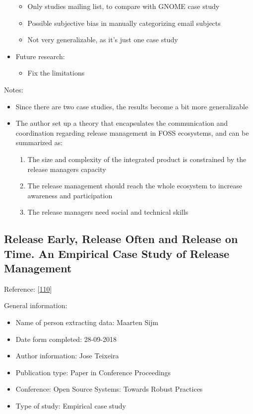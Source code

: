 \documentclass[]{book}
\providecommand{\tightlist}{%
  \setlength{\itemsep}{0pt}\setlength{\parskip}{0pt}}
\begin{document}
\begin{itemize}
  \begin{itemize}
  \tightlist
  \item
    Only studies mailing list, to compare with GNOME case study
  \item
    Possible subjective bias in manually categorizing email subjects
  \item
    Not very generalizable, as it's just one case study
  \end{itemize}
\item
  Future research:

  \begin{itemize}
  \tightlist
  \item
    Fix the limitations
  \end{itemize}
\end{itemize}

Notes:

\begin{itemize}
\tightlist
\item
  Since there are two case studies, the results become a bit more
  generalizable
\item
  The author set up a theory that encapsulates the communication and
  coordination regarding release management in FOSS ecosystems, and can
  be summarized as:

  \begin{enumerate}
  \def\labelenumi{\arabic{enumi}.}
  \tightlist
  \item
    The size and complexity of the integrated product is constrained by
    the release managers capacity
  \item
    The release management should reach the whole ecosystem to increase
    awareness and participation
  \item
    The release managers need social and technical skills
  \end{enumerate}
\end{itemize}

\subsection{Release Early, Release Often and Release on Time. An
Empirical Case Study of Release
Management}\label{release-early-release-often-and-release-on-time.-an-empirical-case-study-of-release-management}

Reference: {[}\protect\hyperlink{ref-teixeira2017a}{110}{]}

General information:

\begin{itemize}
\tightlist
\item
  Name of person extracting data: Maarten Sijm
\item
  Date form completed: 28-09-2018
\item
  Author information: Jose Teixeira
\item
  Publication type: Paper in Conference Proceedings
\item
  Conference: Open Source Systems: Towards Robust Practices
\item
  Type of study: Empirical case study
\end{itemize}
\end{document}
